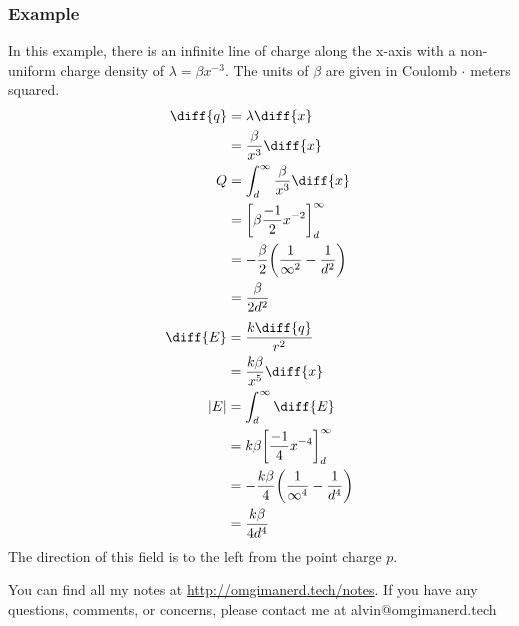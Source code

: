 \documentclass{math}
\begin{document}
\subsubsection*{Example}
\begin{center}
\end{center}
In this example, there is an infinite line of charge along the x-axis with a
non-uniform charge density of \( \lambda = \beta x^{-3} \). The units of
\( \beta \) are given in Coulomb \( \cdot \) meters squared.
\begin{align*}
  \diff{q} &= \lambda\diff{x} \\
  &= \frac{\beta}{x^3}\diff{x} \\
  Q &= \int_{d}^{\infty}\frac{\beta}{x^3}\diff{x} \\
  &= \bigg[\beta\frac{-1}{2}x^{-2}\bigg]_{d}^{\infty} \\
  &= -\frac{\beta}{2}\bigg(\frac{1}{\infty^2}-\frac{1}{d^2}\bigg) \\
  &= \frac{\beta}{2d^2} \\
\end{align*}
\begin{align*}
  \diff{E} &= \frac{k\diff{q}}{r^2} \\
  &= \frac{k\beta}{x^5}\diff{x} \\
  |E| &= \int_{d}^{\infty}\diff{E} \\
  &= k\beta\bigg[\frac{-1}{4}x^{-4}\bigg]_{d}^{\infty} \\
  &= -\frac{k\beta}{4}\bigg(\frac{1}{\infty^4}-\frac{1}{d^4}\bigg) \\
  &= \frac{k\beta}{4d^4}
\end{align*}
The direction of this field is to the left from the point charge \( p \).

\begin{center}
  You can find all my notes at \url{http://omgimanerd.tech/notes}. If you have
  any questions, comments, or concerns, please contact me at
  alvin@omgimanerd.tech
\end{center}
\end{document}
